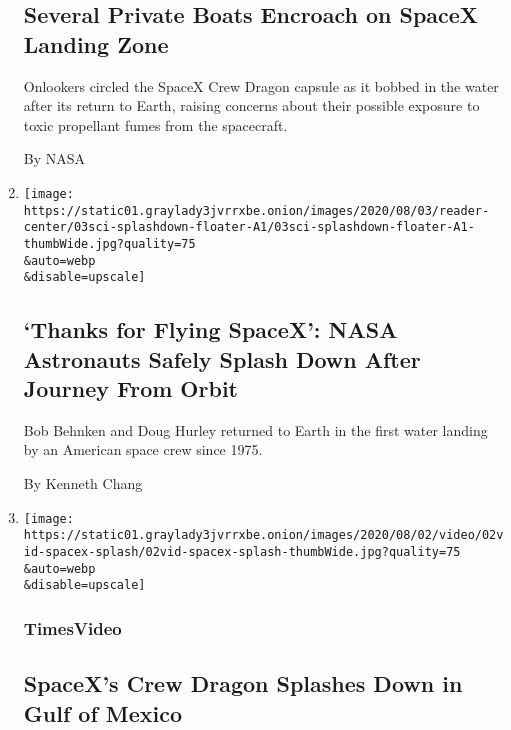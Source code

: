 \begin{enumerate}
  \hypertarget{several-private-boats-encroach-on-spacex-landing-zone}{%
  \subsection{Several Private Boats Encroach on SpaceX Landing
  Zone}\label{several-private-boats-encroach-on-spacex-landing-zone}}

  Onlookers circled the SpaceX Crew Dragon capsule as it bobbed in the
  water after its return to Earth, raising concerns about their possible
  exposure to toxic propellant fumes from the spacecraft.

  By NASA
\item
  \href{/2020/08/02/science/spacex-astronauts-splashdown.html}{}

  \texttt{[image: https://static01.graylady3jvrrxbe.onion/images/2020/08/03/reader-center/03sci-splashdown-floater-A1/03sci-splashdown-floater-A1-thumbWide.jpg?quality=75\\\&auto=webp\\\&disable=upscale]}

  \hypertarget{thanks-for-flying-spacex-nasa-astronauts-safely-splash-down-after-journey-from-orbit}{%
  \subsection{`Thanks for Flying SpaceX': NASA Astronauts Safely Splash
  Down After Journey From
  Orbit}\label{thanks-for-flying-spacex-nasa-astronauts-safely-splash-down-after-journey-from-orbit}}

  Bob Behnken and Doug Hurley returned to Earth in the first water
  landing by an American space crew since 1975.

  By Kenneth Chang
\item
  \href{/video/us/100000007269118/spacex-splash-down.html}{}

  \texttt{[image: https://static01.graylady3jvrrxbe.onion/images/2020/08/02/video/02vid-spacex-splash/02vid-spacex-splash-thumbWide.jpg?quality=75\\\&auto=webp\\\&disable=upscale]}

  \hypertarget{timesvideo-1}{%
  \subsubsection{TimesVideo}\label{timesvideo-1}}

  \hypertarget{spacexs-crew-dragon-splashes-down-in-gulf-of-mexico}{%
  \subsection{SpaceX's Crew Dragon Splashes Down in Gulf of
  Mexico}\label{spacexs-crew-dragon-splashes-down-in-gulf-of-mexico}}


\end{enumerate}
